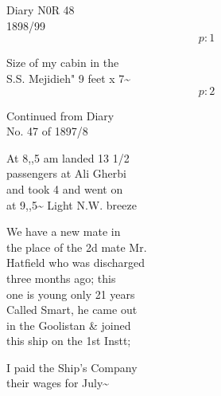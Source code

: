 \documentclass{report}
\begin{document}
\newcommand{\mnote}[1] {\marginpar{\scriptsize \raggedright #1 }}


	\chapter{}

	\marginpar{}

	\par{
 	
	}

	\par{
 	Diary N0R 48\ \\1898/99\ \\
  \[p: 1 \]

	}

	\par{
 	Size of my cabin in the\ \\S.S. Mejidieh" 9 feet x 7\~{}\ \\
  \[p: 2 \]

	}



	\par{
 	Continued from Diary\ \\No. 47 of 1897/8\ \\
	}

	\par{
 	At 8,,5 am landed 13 1/2\ \\passengers at Ali Gherbi\ \\and took 4 and went on\ \\at 9,,5\~{} Light N.W. breeze\ \\
	}

	\par{
 	We have a new mate in\ \\the place of the 2d mate Mr.\ \\Hatfield who was discharged\ \\three months ago; this\ \\one is young only 21 years\ \\Called Smart, he came out\ \\in the Goolistan \& joined\ \\this ship on the 1st Instt;\ \\
	}

	\par{
 	I paid the Ship's Company\ \\their wages for July\~{}\ \\
	}
\end{document}
